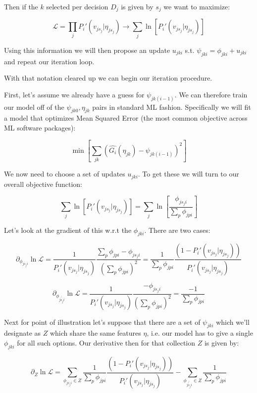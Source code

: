 \documentclass[11pt]{article}
\begin{document}
Then if the $k$ selected per decision $D_j$ is given by $s_j$ we want to maximize:

$$\mathcal{L}=\prod_j P_i'(v_{js_j} | \eta_{js_j})\rightarrow \sum_j \ln{\left[ P_i'(v_{js_j} | \eta_{js_j}) \right]}$$

Using this information we will then propose an update $u_{jki}$ s.t. $\psi_{jki}=\phi_{jki} + u_{jki}$ and repeat our iteration loop. 

With that notation cleared up we can begin our iteration procedure. \newline

First, let's assume we already have a guess for $\psi_{jk(i-1)}$. We can therefore train our model off of the $\psi_{jk0},\eta_{jk}$ pairs in standard ML fashion. Specifically we will fit a model that optimizes Mean Squared Error (the most common objective across ML software packages):

$$\min{\left[ \sum_{jk}\left(\hat{G_i}(\eta_{jk}) - \psi_{jk(i-1)}\right)^2 \right]}$$

We now need to choose a set of updates $u_{jki}$. To get these we will turn to our overall objective function:

$$\sum_j \ln{\left[ P_i'(v_{js_j} | \eta_{js_j}) \right]}= \sum_j \ln{\left[ \frac{\phi_{js_ji}}{\sum_p \phi_{jpi}} \right]}$$

Let's look at the gradient of this w.r.t the $\phi_{jki}$. There are two cases:

$$\partial_{\phi_{js_ji}}\ln{\mathcal{L}}=\frac{1}{P_i'(v_{js_j} | \eta_{js_j})}\frac{\sum_p \phi_{jpi}-\phi_{js_ji}}{\left( \sum_p \phi_{jpi} \right)^2}=\frac{1}{\sum_p \phi_{jpi}}\frac{\left(1-P_i'(v_{js_j} | \eta_{js_j}) \right)}{P_i'(v_{js_j} | \eta_{js_j})}$$ 

$$\partial_{\phi_{j\not{s_j}i}}\ln{\mathcal{L}}=\frac{1}{P_i'(v_{js_j} | \eta_{js_j})}\frac{-\phi_{js_ji}}{\left( \sum_p \phi_{jpi} \right)^2} = \frac{-1 }{\sum_p \phi_{jpi}}$$ 

Next for point of illustration let's suppose that there are a set of $\psi_{jki}$ which we'll designate as $Z$ which share the same features $\eta$, i.e. our model has to give a single $\phi_{jki}$ for all such options. Our derivative then for that collection $Z$ is given by:

$$\partial_Z \ln{\mathcal{L}}=\sum_{\phi_{js_ji} \in Z}\frac{1}{\sum_p \phi_{jpi}}\frac{\left(1-P_i'(v_{js_j} | \eta_{js_j}) \right)}{P_i'(v_{js_j} | \eta_{js_j})}-\sum_{\phi_{j\not{s_j}i}\in Z}\frac{1 }{\sum_p \phi_{jpi}}$$
\end{document}
